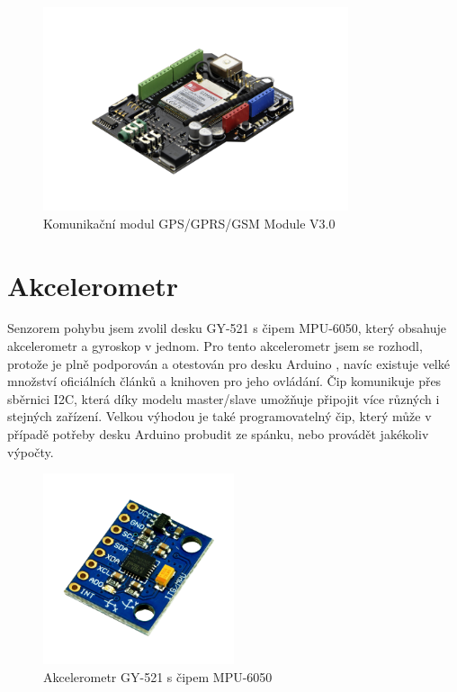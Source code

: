 \documentclass[FM,BP]{tulthesis}  %
\begin{document}
\begin{figure}[H]
\begin{center}
\includegraphics[width=0.8\textwidth]{images/module.png}
\caption{Komunikační modul GPS/GPRS/GSM Module V3.0}
\label{image}
\end{center}
\end{figure}

\section{Akcelerometr}
Senzorem pohybu jsem zvolil desku GY-521 s čipem MPU-6050, který obsahuje akcelerometr a gyroskop v jednom. Pro tento akcelerometr jsem se rozhodl, protože je plně podporován a otestován pro desku Arduino \cite{Arduino acce}, navíc existuje velké množství oficiálních článků a knihoven \cite{I2cdevlib} pro jeho ovládání. Čip komunikuje přes sběrnici I2C, která díky modelu master/slave umožňuje připojit více různých i stejných zařízení. Velkou výhodou je také programovatelný čip, který může v případě potřeby desku Arduino probudit ze spánku, nebo provádět jakékoliv výpočty.

\begin{figure}[H]
\begin{center}
\includegraphics[width=0.5\textwidth]{images/akcelerometr.png}
\caption{Akcelerometr GY-521 s čipem MPU-6050}
\label{image}
\end{center}
\end{figure}
\end{document}
